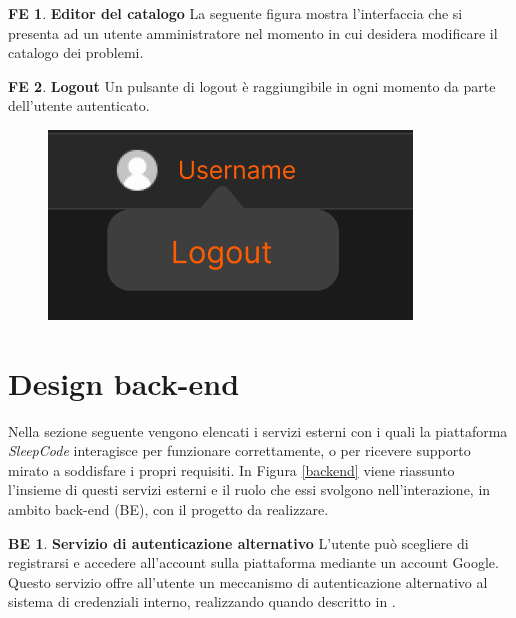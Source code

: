 \documentclass[11pt, a4paper]{article}
\theoremstyle{definition}
\newtheorem{backend}{BE}
\newtheorem{frontend}{FE}
\begin{document}
\newpage

\begin{frontend}
\textbf{Editor del catalogo }
La seguente figura mostra l'interfaccia che si presenta ad un utente
amministratore nel momento in cui desidera modificare il catalogo dei
problemi.
\end{frontend}
\begin{figure}[H]
\centering
\end{figure}

\begin{frontend}
\textbf{Logout }
Un pulsante di logout è raggiungibile in ogni momento da parte dell'utente
autenticato.
\end{frontend}
\begin{figure}[H]
\centering
\includegraphics[scale=0.2]{materiale/immaginife/logout.jpeg}
\end{figure}

\newpage
\section{Design back-end}
Nella sezione seguente vengono elencati i servizi esterni con i quali
la piattaforma \textit{SleepCode} interagisce per funzionare
correttamente, o per ricevere supporto mirato a soddisfare i propri requisiti.
In Figura \ref{backend} viene riassunto l'insieme di questi servizi esterni
e il ruolo che essi svolgono nell'interazione, in ambito back-end (BE),
con il progetto da realizzare.

\begin{backend}
\textbf{Servizio di autenticazione alternativo }
L'utente può scegliere di registrarsi e accedere all'account sulla piattaforma
mediante un account Google. Questo servizio offre all'utente un meccanismo di
autenticazione alternativo al sistema di credenziali interno, realizzando quando
descritto in \textcolor{blue}{}.
\end{backend}
\end{document}
